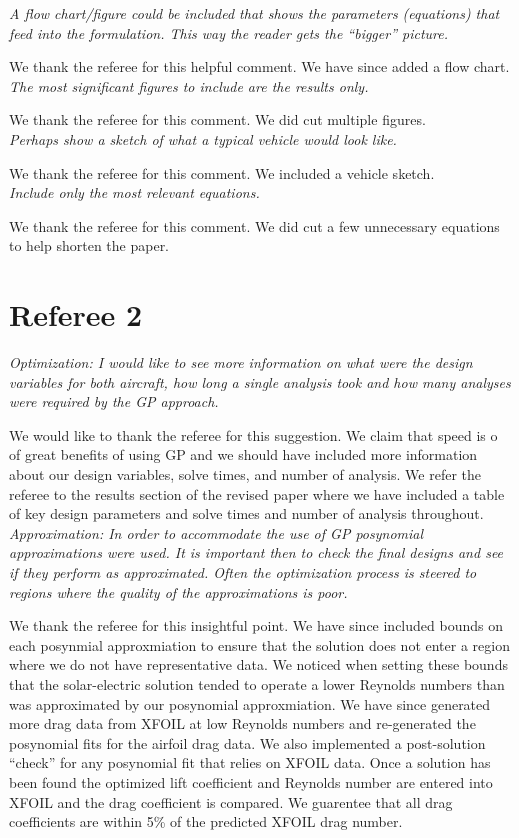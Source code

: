 \documentclass[10pt, a4paper]{article}
\begin{document}
\emph{
A flow chart/figure could be included that shows the parameters (equations) that feed into the formulation. This way the reader gets the “bigger” picture. }

We thank the referee for this helpful comment.  We have since added a flow chart. \\

\emph{
The most significant figures to include are the results only. }

We thank the referee for this comment.  We did cut multiple figures. \\

\emph{
Perhaps show a sketch of what a typical vehicle would look like. }

We thank the referee for this comment.  We included a vehicle sketch.  \\

\emph{
Include only the most relevant equations.
}

We thank the referee for this comment.  We did cut a few unnecessary equations to help shorten the paper. \\

\section*{Referee 2}

\emph{Optimization: I would like to see more information on what were the design variables for both aircraft, how long a single analysis took and how many analyses were required by the GP approach.}

We would like to thank the referee for this suggestion.  
We claim that speed is o of great benefits of using GP and we should have included more information about our design variables, solve times, and number of analysis.  
We refer the referee to the results section of the revised paper where we have included a table of key design parameters and solve times and number of analysis throughout.  \\

\emph{Approximation: In order to accommodate the use of GP posynomial approximations were used. It is important then to check the final designs and see if they perform as approximated. Often the optimization process is steered to regions where the quality of the approximations is poor.}

We thank the referee for this insightful point.  
We have since included bounds on each posynmial approxmiation to ensure that the solution does not enter a region where we do not have representative data.  
We noticed when setting these bounds that the solar-electric solution tended to operate a lower Reynolds numbers than was approximated by our posynomial approxmiation.  
We have since generated more drag data from XFOIL at low Reynolds numbers and re-generated the posynomial fits for the airfoil drag data. 
We also implemented a post-solution ``check''  for any posynomial fit that relies on XFOIL data.  
Once a solution has been found the optimized lift coefficient and Reynolds number are entered into XFOIL and the drag coefficient is compared.  
We guarentee that all drag coefficients are within 5\% of the predicted XFOIL drag number.\\
\end{document}
